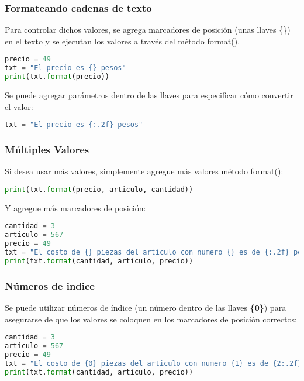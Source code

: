 \begin{frame}[fragile]
  \frametitle{Formateando cadenas de texto}

  Para controlar dichos valores, se agrega marcadores de posición
  (unas llaves \{\}) en el texto y se ejecutan los valores a través del
  método \textcolor{codeKeyword2}{format}().

  \vspace{\baselineskip}
  \begin{lstlisting}[language=Python]
precio = 49
txt = "El precio es {} pesos"
print(txt.format(precio))
  \end{lstlisting}

  \pausa
  Se puede agregar parámetros dentro de las llaves para especificar cómo convertir el valor:

  \vspace{\baselineskip}
  \begin{lstlisting}[language=Python]
txt = "El precio es {:.2f} pesos"
  \end{lstlisting}
\end{frame}

\begin{frame}[fragile]
  \frametitle{Múltiples Valores}

  Si desea usar más valores, simplemente agregue más valores
  método \textcolor{codeKeyword2}{format}():

  \vspace{\baselineskip}
  \begin{lstlisting}[language=Python]
print(txt.format(precio, articulo, cantidad))
  \end{lstlisting}

  \pausa
  Y agregue más marcadores de posición: 

  \vspace{\baselineskip}
  \begin{lstlisting}[language=Python]
cantidad = 3
articulo = 567
precio = 49
txt = "El costo de {} piezas del articulo con numero {} es de {:.2f} pesos"
print(txt.format(cantidad, articulo, precio))
  \end{lstlisting}
\end{frame}

\begin{frame}[fragile]
  \frametitle{Números de indice}

  Se puede utilizar números de índice (un número dentro de las llaves
  \textbf{\{0\}}) para asegurarse de que los valores se coloquen en
  los marcadores de posición correctos: 

  \vspace{\baselineskip}
  \begin{lstlisting}[language=Python]
cantidad = 3
articulo = 567
precio = 49
txt = "El costo de {0} piezas del articulo con numero {1} es de {2:.2f} pesos"
print(txt.format(cantidad, articulo, precio))
  \end{lstlisting}
\end{frame}

